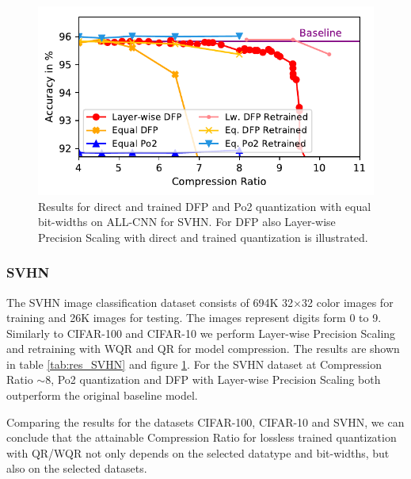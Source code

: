 \begin{figure}[ht!]
\includegraphics[width=\columnwidth]{img/ressvhn.pdf}
\caption{Results for direct and trained DFP and Po2 quantization with equal bit-widths on ALL-CNN for SVHN. For DFP also Layer-wise Precision Scaling with direct and trained quantization is illustrated.}\label{fig:lw_svhn}
\end{figure}
\subsubsection{SVHN}
The SVHN image classification dataset consists of 694K 32$\times$32 color images for training and 26K images for testing. The images represent digits form 0 to 9.
Similarly to CIFAR-100 and CIFAR-10 we perform Layer-wise Precision Scaling and retraining with WQR and QR for model compression. The results are shown in table \ref{tab:res_SVHN} and figure \ref{fig:lw_svhn}. For the SVHN dataset at Compression Ratio $\sim 8$, Po2 quantization and DFP with Layer-wise Precision Scaling both outperform the original baseline model.

\vspace{1ex}
Comparing the results for the datasets CIFAR-100, CIFAR-10 and SVHN, we can conclude that the attainable Compression Ratio for lossless trained quantization with QR/WQR not only depends on the selected datatype and bit-widths, but also on the selected datasets. 

